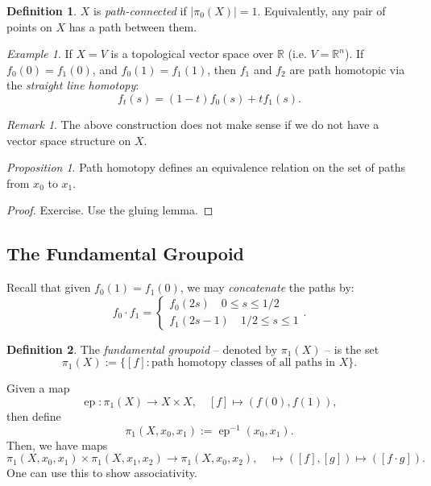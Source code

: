 \documentclass[a4paper]{report}
\theoremstyle{definition}
\newtheorem{definition}{Definition}
\theoremstyle{remark}
\newtheorem{remark}{Remark}
\theoremstyle{proposition}
\newtheorem{proposition}{Proposition}
\theoremstyle{conjecture}
\theoremstyle{lemma}
\theoremstyle{corollary}
\theoremstyle{exercise}
\newtheorem{example}{Example}
\newcommand{\on}{\operatorname}
\begin{document}
\begin{definition}
    $X$ is \emph{path-connected} if $\vert \pi_0(X) \vert = 1$. 
    Equivalently, any pair of points on $X$ has a path between them.
\end{definition}

\begin{example}
    If $X = V$ is a topological vector space over $\mathbb{R}$ 
    (i.e. $V = \mathbb{R}^n$). If $f_0(0) = f_1(0)$, and 
    $f_0(1) = f_1(1)$, then $f_1$ and $f_2$ are path homotopic via
    the \emph{straight line homotopy}:
    $$f_t(s) = (1-t)f_0(s) + tf_1(s).$$
\end{example}

\begin{remark}
    The above construction does not make sense if we do not have a vector
    space structure on $X$. 
\end{remark}

\begin{proposition}
    Path homotopy defines an equivalence relation on the set of paths 
    from $x_0$ to $x_1$.
\end{proposition}

\begin{proof}
    Exercise. Use the gluing lemma.
\end{proof}

\subsection{The Fundamental Groupoid}

Recall that given $f_0(1) = f_1(0)$, we may \emph{concatenate} the paths by:
$$f_0 \cdot f_1 = \begin{cases}
    f_0(2s) \quad 0\leq s \leq 1/2\\
    f_1(2s-1) \quad 1/2 \leq s \leq 1
\end{cases}.$$

\begin{definition}
    The \emph{fundamental groupoid} -- denoted by $\pi_1(X)$ -- is the set 
    $$\pi_1(X) := \lbrace [f] : \text{path homotopy classes of all paths in $X$}\rbrace.$$
\end{definition}

Given a map 
$$\on{ep} : \pi_1(X) \longrightarrow X \times X,\quad [f] \longmapsto (f(0),f(1)),$$
then define 
$$\pi_1(X,x_0,x_1) := \on{ep}^{-1} (x_0,x_1).$$
Then, we have maps
$$\pi_1(X,x_0,x_1) \times \pi_1(X,x_1,x_2) \longrightarrow \pi_1(X,x_0,x_2),\quad \longmapsto ([f],[g]) \longmapsto ([f\cdot g]).$$
One can use this to show associativity.
\end{document}
